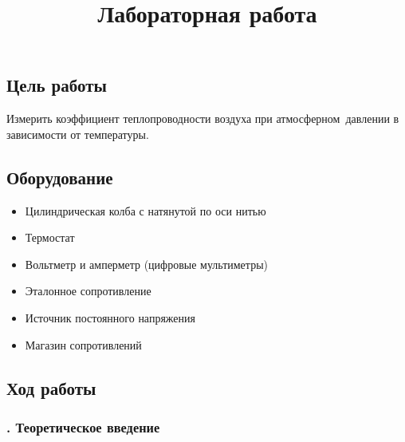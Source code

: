 \documentclass[a4paper, 12pt]{article}
\title{
  Лабораторная работа \textnumero \\
  \textbf{\textquote{\unskip}}
}
\author{}
\date{}
\begin{document}
\maketitle\thispagestyle{fancy}

\subsection*{Цель работы}
Измерить коэффициент теплопроводности воздуха при атмосферном\
давлении в зависимости от температуры.

\subsection*{Оборудование}
\begin{itemize}[noitemsep]
  \item Цилиндрическая колба с натянутой по оси нитью
  \item Термостат
  \item Вольтметр и амперметр (цифровые мультиметры)
  \item Эталонное сопротивление
  \item Источник постоянного напряжения
  \item Магазин сопротивлений
\end{itemize}

\subsection*{{Ход работы}}
\subsubsection*{. Теоретическое введение}
\end{document}
